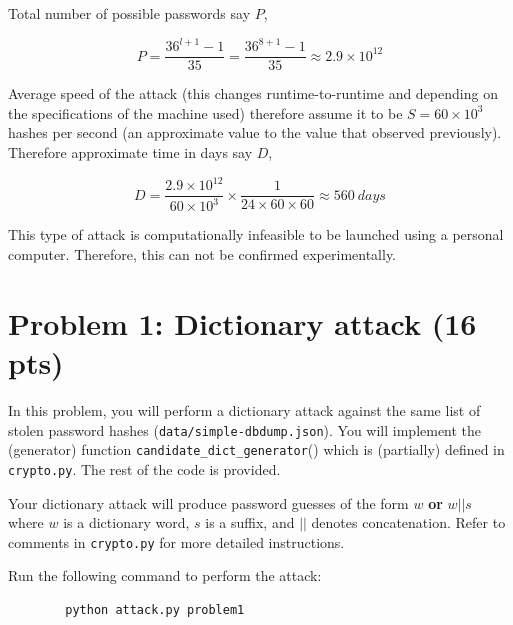 \documentclass[11pt,letterpaper]{article}
\newenvironment{answer}{\em \color{blue} \begin{adjustwidth}{1cm}{1cm}}{\end{adjustwidth}}
\begin{document}
\begin{enumerate}
\begin{answer}
			Total number of possible passwords say $P$,
			
			\[
			P = \frac{36^{l+1}-1}{35} = \frac{36^{8+1}-1}{35} \approx 2.9 \times 10^{12}
			\]
			
			Average speed of the attack (this changes runtime-to-runtime and depending on the specifications of the machine used) therefore assume it to be $S = 60 \times 10^{3}$ hashes per second (an approximate value to the value that observed previously).\\
			
			Therefore approximate time in days say $D$,
			
			\[
			D = \frac{2.9 \times 10^{12}}{60 \times 10^{3}} \times \frac{1}{24 \times 60 \times 60} \approx 560~ days
			\]
			
			This type of attack is computationally infeasible to be launched using a personal computer. Therefore, this can not be confirmed experimentally.
			
		\end{answer}
		
	\end{enumerate}
	
	\newpage
	\section*{Problem 1: Dictionary attack (16 pts)}
	
	In this problem, you will perform a dictionary attack against the same list of stolen password hashes (\texttt{data/simple-dbdump.json}). You will implement the (generator) function \texttt{candidate\_dict\_generator}() which is (partially) defined in \texttt{crypto.py}. The rest of the code is provided.
	
	Your dictionary attack will produce password guesses of the form $w$ {\bf or} $w||s$ where $w$ is a dictionary word, $s$ is a suffix, and $||$ denotes concatenation. Refer to comments in \texttt{crypto.py} for more detailed instructions.
	
	Run the following command to perform the attack:
	\begin{Verbatim}
		python attack.py problem1
	\end{Verbatim}
	
\end{document}
